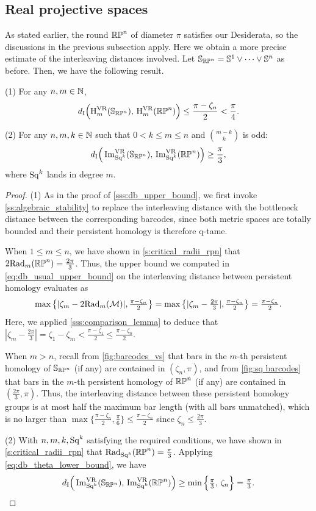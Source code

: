 \subsection{Real projective spaces}\label{ss:distance_estimate_rpn}

As stated earlier, the round \(\mathbb{RP}^n\) of diameter \(\pi\) satisfies our Desiderata, so the discussions in the previous subsection apply.
Here we obtain a more precise estimate of the interleaving distances involved.
Let \(\mathbb{S}_{\mathbb{RP}^n} = \mathbb{S}^1 \vee \dots \vee \mathbb{S}^n\) as before.
Then, we have the following result.

\theorem
(1) For any \(n,m \in \mathbb{N}\),
\[
d_{\mathrm{I}}\Big(\mathrm{H}^{\mathrm{VR}}_m(\mathbb{S}_{\mathbb{RP}^n}),\, \mathrm{H}^{\mathrm{VR}}_m(\mathbb{RP}^n)\Big) \leq \frac{\pi - \zeta_n}{2} < \frac{\pi}{4}.
\]

\noindent (2) For any \(n,m,k \in \mathbb{N}\) such that \(0 < k \leq m \leq n\) and \(\binom{m-k}{k}\) is odd:
\[
d_{\mathrm{I}}\Big(\operatorname{Im}_{\mathrm{Sq}^k}^{\mathrm{VR}}(\mathbb{S}_{\mathbb{RP}^n}),\, \operatorname{Im}_{\mathrm{Sq}^k}^{\mathrm{VR}}(\mathbb{RP}^n)\Big) \geq \frac{\pi}{3},
\]
where $\mathrm{Sq}^k$ lands in degree \(m\).

\begin{proof}
	(1)
	As in the proof of \cref{sss:db_upper_bound}, we first invoke \cref{ss:algebraic_stability} to replace the interleaving distance with the bottleneck distance between the corresponding barcodes, since both metric spaces are totally bounded and their persistent homology is therefore q-tame.

	When $1 \leq m \leq n$, we have shown in \cref{s:critical_radii_rpn} that
	$2\mathrm{Rad}_{m}(\mathbb{RP}^n) = \tfrac{2\pi}{3}$.
	Thus, the upper bound we computed in \cref{eq:db_usual_upper_bound} on the interleaving distance between persistent homology evaluates as
	\[\max\big\{|\zeta_m - 2\mathrm{Rad}_{m}(\mathcal{M}) |, \tfrac{\pi - \zeta_n}{2}\big\} =
	\max \big\{ |\zeta_m - \tfrac{2\pi}{3} |, \tfrac{\pi - \zeta_n}{2} \big\}
	= \tfrac{\pi - \zeta_n}{2}.
	\]
	Here, we applied \cref{sss:comparison_lemma} to deduce that $|\zeta_m - \tfrac{2\pi}{3}| = \zeta_1 - \zeta_m < \tfrac{\pi - \zeta_1}{2} \leq \tfrac{\pi - \zeta_n}{2}$.

	When $m > n$, recall from \cref{fig:barcodes_vs} that bars in the $m$-th persistent homology of $\mathbb{S}_{\mathbb{RP}^n}$ (if any) are contained in $(\zeta_n, \pi)$, and from \cref{fig:sq barcodes} that bars in the $m$-th persistent homology of $\mathbb{RP}^n$ (if any) are contained in $(\tfrac{2\pi}{3}, \pi)$.
	Thus, the interleaving distance between these persistent homology groups is at most half the maximum bar length (with all bars unmatched), which is no larger than $\max\{\tfrac{\pi - \zeta_n}{2}, \tfrac{\pi}{6}\} \leq \tfrac{\pi - \zeta_n}{2}$ since $\zeta_n \leq \tfrac{2\pi}{3}$.

	(2) With $n,m,k,\mathrm{Sq}^k$ satisfying the required conditions, we have shown in \cref{s:critical_radii_rpn} that
	$\mathrm{Rad}_{\mathrm{Sq}^k}(\mathbb{RP}^n) = \tfrac{\pi}{3}$.
	Applying \cref{eq:db_theta_lower_bound}, we have
	\[d_{\mathrm{I}}\Big(\operatorname{Im}_{\mathrm{Sq}^k}^{\mathrm{VR}}(\mathbb{S}_{\mathbb{RP}^n}),\, \operatorname{Im}_{\mathrm{Sq}^k}^{\mathrm{VR}}(\mathbb{RP}^n)\Big)
	\geq \min\Big\{\tfrac{\pi}{3},\, \zeta_n\Big\}
	= \tfrac{\pi}{3}.\qedhere
	\]
\end{proof}


